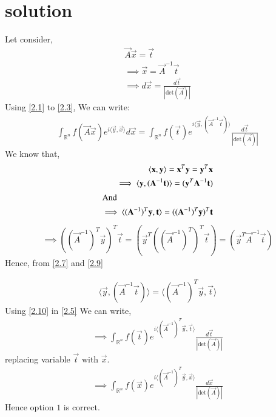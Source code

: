 \documentclass[journal,12pt,twocolumn]{IEEEtran}
\numberwithin{table}{section}
\begin{document}
	\section{solution}
Let consider,
\begin{align}
\vec{A}\vec{x} = \vec{t} \label{2.1}\\
\implies \vec{x} = \vec{A}^{-1}\vec{t} \label{2.2}\\
\implies d\vec{x} = \frac{d\vec{t}}{ \left | \text{det} (\vec{A}) \right |} \label{2.3}
\end{align}
Using  \eqref{2.1} to \eqref{2.3}, We can write: 
\begin{multline}
\int_{\mathbb{R}^n} f(\vec{A}\vec{x}) e^{i\langle \vec{y},\vec{x}\rangle} d\vec{x}  = \int_{\mathbb{R}^n} f(\vec{t}) e^{i \langle \vec{y},(\vec{A}^{-1}\vec{t})\rangle} \frac{d\vec{t}}{\left| \text{det}(\vec{A}) \right|} \label{2.5}
\end{multline}
We know that,
\begin{align}
\langle \vec{x},\vec{y} \rangle = \vec{x}^T\vec{y} = \vec{y}^T\vec{x}\\
\implies \langle \vec{y}, (\vec{A}^{-1}\vec{t})\rangle = (\vec{y}^T\vec{A}^{-1}\vec{t}) \label{2.7}\\
\intertext{And}
\implies  \langle (\vec{A}^{-1})^{T}\vec{y},\vec{t}\rangle = ((\vec{A}^{-1})^{T}\vec{y})^T\vec{t}
\end{align}
\begin{multline}
\implies   ((\vec{A}^{-1})^T\vec{y})^T\vec{t} = (\vec{y}^T((\vec{A}^{-1})^T)^T\vec{t}) = (\vec{y}^T\vec{A}^{-1}\vec{t}) \label{2.9}
\end{multline}
Hence, from \eqref{2.7} and \eqref{2.9}

\begin{align}
 \langle \vec{y}, (\vec{A}^{-1}\vec{t})\rangle  =  \langle(\vec{A}^{-1})^{T}\vec{y},\vec{t} \rangle    \label{2.10}
\end{align}
Using \eqref{2.10} in \eqref{2.5} We can write,
\begin{align}
\implies \int_{\mathbb{R}^n} f(\vec{t}) e^{i \langle (\vec{A}^{-1})^{T}\vec{y},\vec{t} \rangle} \frac{d\vec{t}}{\left| \text{det}(\vec{A}) \right|}
\end{align}
replacing variable  $\vec{t}$ with $\vec{x}$.
\begin{align}
\implies \int_{\mathbb{R}^n} f(\vec{x}) e^{i \langle (\vec{A}^{-1})^{T}\vec{y},\vec{x} \rangle} \frac{d\vec{x}}{\left| \text{det}(\vec{A}) \right|}
\end{align}
Hence option $1$ is correct.
\end{document}
